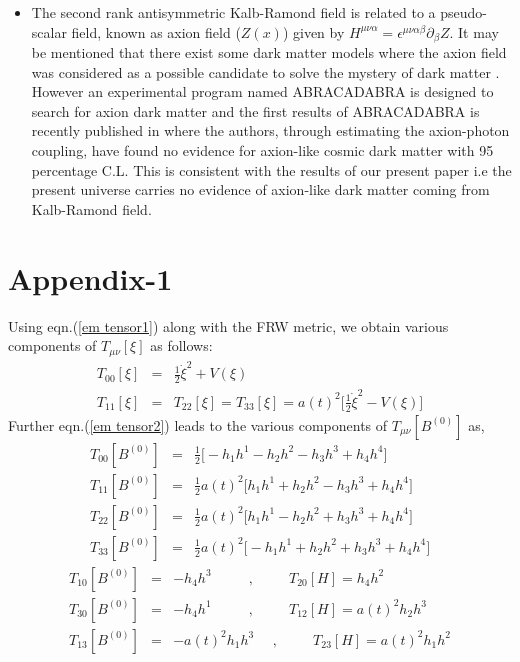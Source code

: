 \documentclass[a4paper]{article}
\begin{document}
\begin{itemize}
\item The second rank antisymmetric Kalb-Ramond field is related to a pseudo-scalar field, known as axion field ($Z(x)$) given by 
$H^{\mu\nu\alpha} = \epsilon^{\mu\nu\alpha\beta}\partial_{\beta}Z$. It may be mentioned that there exist some dark matter models where the axion field was 
considered as a possible candidate to solve the mystery of dark matter \cite{axion1,axion2,axion3}. 
However an experimental program named ABRACADABRA is designed 
to search for axion dark matter and the first results of ABRACADABRA is recently published in \cite{ABRACADABRA} where the authors, through 
estimating the axion-photon coupling, have found no evidence for axion-like cosmic dark matter with 95 percentage C.L. This is consistent with 
the results of our present paper i.e the present universe carries no evidence of axion-like dark matter coming from Kalb-Ramond field.
 
 
\end{itemize}


\section*{Appendix-1}
Using eqn.(\ref{em tensor1}) along with the FRW metric, we obtain various components of $T_{\mu\nu}[\xi]$ as follows:
\begin{eqnarray}
 T_{00}[\xi]&=&\frac{1}{2}\dot{\xi}^2 + V(\xi)\nonumber\\
 T_{11}[\xi]&=&T_{22}[\xi] = T_{33}[\xi] = a(t)^2\bigg[\frac{1}{2}\dot{\xi}^2 - V(\xi)\bigg]
 \nonumber
\end{eqnarray}
Further eqn.(\ref{em tensor2}) leads to the various components of $T_{\mu\nu}[B^{(0)}]$ as,
\begin{eqnarray}
 T_{00}[B^{(0)}]&=&\frac{1}{2}\bigg[-h_1h^1 - h_2h^2 - h_3h^3 + h_4h^4\bigg]\nonumber\\
 T_{11}[B^{(0)}]&=&\frac{1}{2}a(t)^2\bigg[h_1h^1 + h_2h^2 - h_3h^3 + h_4h^4\bigg]\nonumber\\
 T_{22}[B^{(0)}]&=&\frac{1}{2}a(t)^2\bigg[h_1h^1 - h_2h^2 + h_3h^3 + h_4h^4\bigg]\nonumber\\
 T_{33}[B^{(0)}]&=&\frac{1}{2}a(t)^2\bigg[-h_1h^1 + h_2h^2 + h_3h^3 + h_4h^4\bigg]
 \nonumber
\end{eqnarray}
\begin{eqnarray}
 T_{10}[B^{(0)}]&=&-h_4h^3~~~~~~~~~~~~,~~~~~~~~~~~T_{20}[H] = h_4h^2\nonumber\\
 T_{30}[B^{(0)}]&=&-h_4h^1~~~~~~~~~~~~,~~~~~~~~~~~T_{12}[H] = a(t)^2h_2h^3\nonumber\\
 T_{13}[B^{(0)}]&=&-a(t)^2h_1h^3~~~~~~,~~~~~~~~~~~T_{23}[H] = a(t)^2h_1h^2
 \nonumber
\end{eqnarray}
\end{document}
